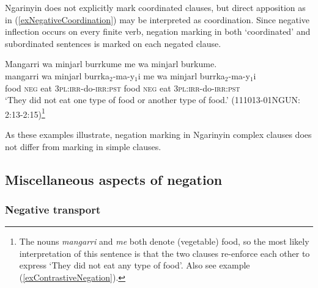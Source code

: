 \documentclass[output=paper,colorlinks,citecolor=brown]{langscibook}
\begin{document}

Ngarinyin does not explicitly mark coordinated clauses, but direct apposition as in (\ref{exNegativeCoordination}) may be interpreted as coordination. Since negative inflection occurs on every finite verb, negation marking in both `coordinated' and subordinated sentences is marked on each negated clause.

\ea \label{exNegativeCoordination}
    \glll Mangarri wa minjarl burrkume me wa minjarl burkume.\\
    mangarri wa minjarl burrka$_2$-ma-y$_1$i me wa minjarl burrka$_2$-ma-y$_1$i\\
    food \textsc{neg} eat 3\textsc{pl:irr}-do-\textsc{irr:pst} food \textsc{neg} eat 3\textsc{pl:irr}-do-\textsc{irr:pst}\\
    \trans `They did not eat one type of food or another type of food.' (111013-01NGUN: 2:13-2:15)\footnote{The nouns \textit{mangarri} and \textit{me} both denote (vegetable) food, so the most likely interpretation of this sentence is that the two clauses re-enforce each other to express `They did not eat any type of food'. Also see example (\ref{exContrastiveNegation}).}
\z

As these examples illustrate, negation marking in Ngarinyin complex clauses does not differ from marking in simple clauses.

\subsection{Miscellaneous aspects of negation}
\subsubsection{Negative transport}
\end{document}
